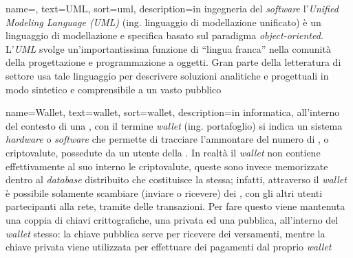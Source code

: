 {
    name=,
    text=UML,
    sort=uml,
    description={in ingegneria del \textit{software} l'\emph{Unified Modeling Language (UML)} (ing. linguaggio di modellazione unificato) è un linguaggio di modellazione e specifica basato sul paradigma \textit{object-oriented}. L'\emph{UML} svolge un'importantissima funzione di ``lingua franca'' nella comunità della progettazione e programmazione a oggetti. Gran parte della letteratura di settore usa tale linguaggio per descrivere soluzioni analitiche e progettuali in modo sintetico e comprensibile a un vasto pubblico}
}

{
	name=Wallet,
	text=wallet,
	sort=wallet,
	description={in informatica, all'interno del contesto di una , con il termine \emph{wallet} (ing. portafoglio) si indica un sistema \textit{hardware} o \textit{software} che permette di tracciare l'ammontare del numero di , o criptovalute, possedute da un utente della . In realtà il \emph{wallet} non contiene effettivamente al suo interno le criptovalute, queste sono invece memorizzate dentro al \textit{database} distribuito che costituisce la  stessa; infatti, attraverso il \emph{wallet} è possibile solamente scambiare (inviare o ricevere) dei , con gli altri utenti partecipanti alla rete, tramite delle transazioni. Per fare questo viene mantenuta una coppia di chiavi crittografiche, una privata ed una pubblica, all'interno del \emph{wallet} stesso: la chiave pubblica serve per ricevere dei versamenti, mentre la chiave privata viene utilizzata per effettuare dei pagamenti dal proprio \emph{wallet}}
}
